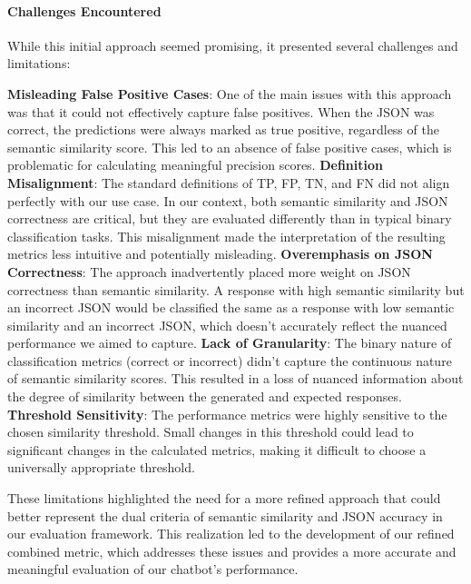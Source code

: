 \paragraph{Challenges Encountered}
While this initial approach seemed promising, it presented several challenges and limitations:

\textbf{Misleading False Positive Cases}: One of the main issues with this approach was that it could not effectively capture false positives. When the JSON was correct, the predictions were always marked as true positive, regardless of the semantic similarity score. This led to an absence of false positive cases, which is problematic for calculating meaningful precision scores.
\textbf{Definition Misalignment}: The standard definitions of TP, FP, TN, and FN did not align perfectly with our use case. In our context, both semantic similarity and JSON correctness are critical, but they are evaluated differently than in typical binary classification tasks. This misalignment made the interpretation of the resulting metrics less intuitive and potentially misleading.
\textbf{Overemphasis on JSON Correctness}: The approach inadvertently placed more weight on JSON correctness than semantic similarity. A response with high semantic similarity but an incorrect JSON would be classified the same as a response with low semantic similarity and an incorrect JSON, which doesn't accurately reflect the nuanced performance we aimed to capture.
\textbf{Lack of Granularity}: The binary nature of classification metrics (correct or incorrect) didn't capture the continuous nature of semantic similarity scores. This resulted in a loss of nuanced information about the degree of similarity between the generated and expected responses.
\textbf{Threshold Sensitivity}: The performance metrics were highly sensitive to the chosen similarity threshold. Small changes in this threshold could lead to significant changes in the calculated metrics, making it difficult to choose a universally appropriate threshold.

These limitations highlighted the need for a more refined approach that could better represent the dual criteria of semantic similarity and JSON accuracy in our evaluation framework. This realization led to the development of our refined combined metric, which addresses these issues and provides a more accurate and meaningful evaluation of our chatbot's performance.